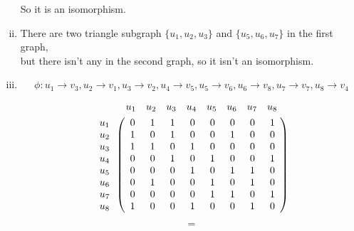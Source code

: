 \documentclass{article}
\begin{document}
\begin{enumerate}[i)]
So it is an isomorphism.
\item
There are two triangle subgraph $\lbrace u_1,u_2,u_3\rbrace$ and $\lbrace u_5,u_6,u_7\rbrace$ in the first graph,\\
but there isn't any in the second graph, so it isn't an isomorphism.
\item
$$\phi:u_1\to v_3,u_2\to v_1,u_3\to v_2,u_4\to v_5,
	   u_5\to v_6,u_6\to v_8,u_7\to v_7,u_8\to v_4$$

\begin{minipage}{0.47\linewidth}
\begin{gather*}
\begin{array}{c@{\hspace{2em}}cccccccc}
&u_1&u_2&u_3&u_4&u_5&u_6&u_7&u_8
\end{array}
\\
\begin{array}{c}
u_1\\u_2\\u_3\\u_4\\u_5\\u_6\\u_7\\u_8
\end{array}\left(
\begin{array}{c@{\hspace{1.5em}}c@{\hspace{1.5em}}c@{\hspace{1.5em}}c@{\hspace{1.5em}}c@{\hspace{1.5em}}c@{\hspace{1.5em}}c@{\hspace{1.5em}}c}
0&1&1&0&0&0&0&1\\
1&0&1&0&0&1&0&0\\
1&1&0&1&0&0&0&0\\
0&0&1&0&1&0&0&1\\
0&0&0&1&0&1&1&0\\
0&1&0&0&1&0&1&0\\
0&0&0&0&1&1&0&1\\
1&0&0&1&0&0&1&0\\
\end{array}\right)
\end{gather*}
\end{minipage}
\hfill
\begin{minipage}{0.04\linewidth}
$$=$$
\end{minipage}
\hfill
\begin{minipage}{0.47\linewidth}

\end{minipage}
\end{enumerate}
\end{document}
